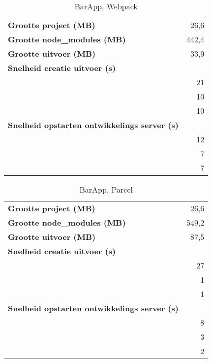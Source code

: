\begin{table}[h]
    \centering
    \begin{tabular}{lr}
    \textbf{Grootte project (MB)} & 26,6 \\
    \textbf{Grootte node\_modules (MB)} & 442,4 \\
    \textbf{Grootte uitvoer (MB)} & 33,9 \\
    \textbf{Snelheid creatie uitvoer (s)} & \\
    \textbf{} & 21 \\
    \textbf{} & 10 \\
    \textbf{} & 10 \\
    \textbf{Snelheid opstarten ontwikkelings server (s)} & \\
    \textbf{} & 12 \\
    \textbf{} & 7 \\
    \textbf{} & 7
    \end{tabular}
    \caption{BarApp, Webpack}
    \end{table}

    \begin{table}[h]
        \centering
        \begin{tabular}{lr}
        \textbf{Grootte project (MB)} & 26,6 \\
        \textbf{Grootte node\_modules (MB)} & 549,2 \\
        \textbf{Grootte uitvoer (MB)} & 87,5 \\
        \textbf{Snelheid creatie uitvoer (s)} & \\
        \textbf{} & 27 \\
        \textbf{} & 1 \\
        \textbf{} & 1 \\
        \textbf{Snelheid opstarten ontwikkelings server (s)} & \\
        \textbf{} & 8 \\
        \textbf{} & 3 \\
        \textbf{} & 2
        \end{tabular}
        \caption{BarApp, Parcel}
        \end{table}

